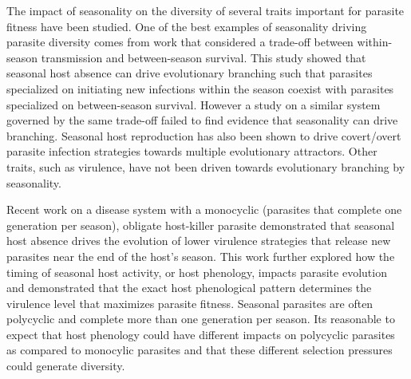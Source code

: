 \documentclass{article}
\begin{document}
The impact of seasonality on the diversity of several traits important for parasite fitness have been studied. 
One of the best examples of seasonality driving parasite diversity comes from work that considered a trade-off between within-season transmission and between-season survival\cite{hamelin2011seasonality}. This study showed that seasonal host absence can drive evolutionary branching such that parasites specialized on initiating new infections within the season coexist with parasites specialized on between-season survival. However a study on a similar system governed by the same trade-off failed to find evidence that seasonality can drive branching\cite{van2010periodicity}. Seasonal host reproduction has also been shown to drive covert/overt parasite infection strategies towards multiple evolutionary attractors\cite{sorrell2009evolution}. Other traits, such as virulence, have not been driven towards evolutionary branching by seasonality\cite{donnelly2013seasonality}.


Recent work on a disease system with a monocyclic (parasites that complete one generation per season), obligate host-killer parasite demonstrated that seasonal host absence drives the evolution of lower virulence strategies that release new parasites near the end of the host's season. This work further explored how the timing of seasonal host activity, or host phenology, impacts parasite evolution and demonstrated that the exact host phenological pattern determines the virulence level that maximizes parasite fitness. Seasonal parasites are often polycyclic and complete more than one generation per season. Its reasonable to expect that host phenology could have different impacts on polycyclic parasites as compared to monocylic parasites and that these different selection pressures could generate diversity. 
\end{document}
